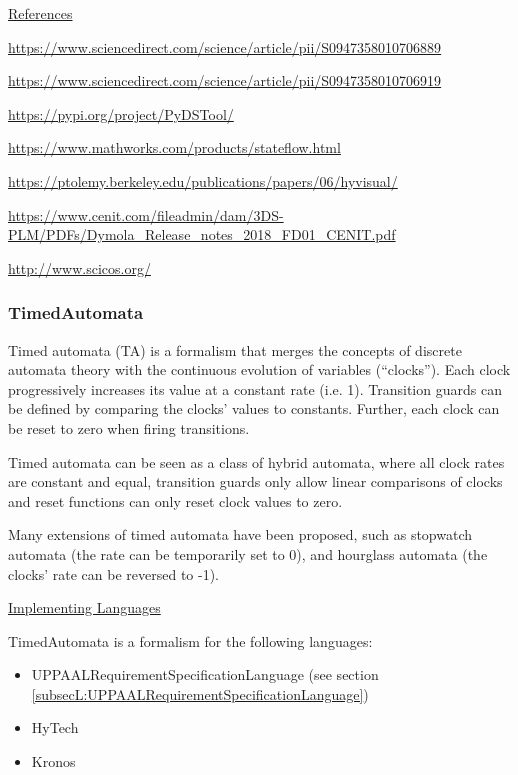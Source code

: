 \underline{References}

\url{https://www.sciencedirect.com/science/article/pii/S0947358010706889}

\url{https://www.sciencedirect.com/science/article/pii/S0947358010706919}

\url{https://pypi.org/project/PyDSTool/}

\url{https://www.mathworks.com/products/stateflow.html}

\url{https://ptolemy.berkeley.edu/publications/papers/06/hyvisual/}

\url{https://www.cenit.com/fileadmin/dam/3DS-PLM/PDFs/Dymola_Release_notes_2018_FD01_CENIT.pdf}

\url{http://www.scicos.org/}


\subsubsection{TimedAutomata}
\label{subsubsecF:TimedAutomata}


Timed automata (TA) is a formalism that merges the concepts of discrete automata theory with the continuous evolution of variables (``clocks'').  Each clock progressively increases its value at a constant rate (i.e. 1). Transition guards can be defined by comparing the clocks' values to constants. Further, each clock can be reset to zero when firing transitions.

Timed automata can be seen as a class of hybrid automata, where all clock rates are constant and equal, transition guards only allow linear comparisons of clocks and reset functions can only reset clock values to zero.

Many extensions of timed automata have been proposed, such as stopwatch automata (the rate can be temporarily set to 0), and hourglass automata (the clocks' rate can be reversed to -1).

\underline{Implementing Languages}

TimedAutomata is a formalism for the following languages:
\begin{itemize}
	\item UPPAALRequirementSpecificationLanguage (see section \ref{subsecL:UPPAALRequirementSpecificationLanguage})
	\item HyTech
	\item Kronos
\end{itemize}



